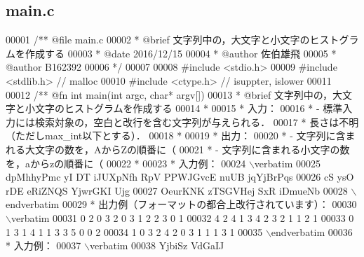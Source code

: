 \subsection{main.\-c}

\begin{DoxyCode}
00001 \textcolor{comment}{/**  @file main.c}
00002 \textcolor{comment}{ *   @brief  文字列中の，大文字と小文字のヒストグラムを作成する}
00003 \textcolor{comment}{ *   @date   2016/12/15}
00004 \textcolor{comment}{ *   @author 佐伯雄飛}
00005 \textcolor{comment}{ *   @author B162392}
00006 \textcolor{comment}{ */}
00007 
00008 \textcolor{preprocessor}{#include <stdio.h>}
00009 \textcolor{preprocessor}{#include <stdlib.h>}  \textcolor{comment}{// malloc}
00010 \textcolor{preprocessor}{#include <ctype.h>}   \textcolor{comment}{// isuppter, islower}
00011 \textcolor{comment}{}
00012 \textcolor{comment}{/** @fn int main(int argc, char* argv[])}
00013 \textcolor{comment}{ *  @brief 文字列中の，大文字と小文字のヒストグラムを作成する}
00014 \textcolor{comment}{ *}
00015 \textcolor{comment}{ *  入力：}
00016 \textcolor{comment}{ *  - 標準入力には検索対象の，空白と改行を含む文字列が与えられる．}
00017 \textcolor{comment}{ *    長さは不明（ただしmax\_int以下とする）．}
00018 \textcolor{comment}{ *}
00019 \textcolor{comment}{ *  出力：}
00020 \textcolor{comment}{ *  - 文字列に含まれる大文字の数を，AからZの順番に（%
00021 \textcolor{comment}{ *  - 文字列に含まれる小文字の数を，aからzの順番に（%
00022 \textcolor{comment}{ *}
00023 \textcolor{comment}{ *  入力例：}
00024 \textcolor{comment}{\(\backslash\)verbatim}
00025 \textcolor{comment}{dpMhhyPmc yI DT iJUXpNfh RpV PPWJGvcE nuUB jqYjBrPqs}
00026 \textcolor{comment}{cS ysO rDE eRiZNQS YjwrGKI Ujg}
00027 \textcolor{comment}{OeurKNK zTSGVHej SxR iDmueNb}
00028 \textcolor{comment}{\(\backslash\)endverbatim}
00029 \textcolor{comment}{  *  出力例（フォーマットの都合上改行されています）：}
00030 \textcolor{comment}{\(\backslash\)verbatim}
00031 \textcolor{comment}{    0     2     0     3     2     0     3     1     2     2     3     0     1}
00032 \textcolor{comment}{4     2     4     1     3     4     2     3     2     1     1     2     1}
00033 \textcolor{comment}{    0     1     3     1     4     1     1     3     3     5     0     0     2}
00034 \textcolor{comment}{1     0     3     2     4     2     0     3     1     1     1     3     1}
00035 \textcolor{comment}{\(\backslash\)endverbatim}
00036 \textcolor{comment}{  *  入力例：}
00037 \textcolor{comment}{\(\backslash\)verbatim}
00038 \textcolor{comment}{YjbiSz VdGaIJ}
}}
\end{DoxyCode}
